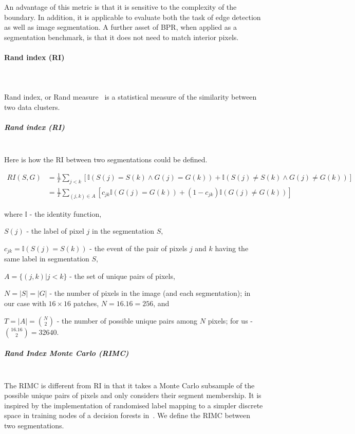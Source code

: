 An advantage of this  metric is that it is sensitive to the complexity of the boundary. In addition, it is applicable to evaluate both the task of edge detection as well as image segmentation. A further asset of BPR, when applied as a segmentation benchmark, is that it does not need to match interior pixels.

\paragraph{Rand index (RI)}\mbox{}\\\mbox{}\\
Rand index, or Rand measure~\cite{rand1971objective} is a statistical measure of the similarity between two data clusters.

\subparagraph{Rand index (RI)}\mbox{}\\
\label{par:ch4-RI-maths}
Here is how the RI between two segmentations could be defined.

\begin{align*}
RI(S,G) & =\frac{1}{T}\sum\limits _{j<k}\left[\mathbb{I}\left(S(j)=S(k)\wedge G(j)=G(k)\right)+\mathbb{I}\left(S(j)\neq S(k)\wedge G(j)\neq G(k)\right)\right]\\
 & =\frac{1}{T}\sum\limits _{(j,k)\in A}\left[c_{jk}\mathbb{I}\left(G(j)=G(k)\right)+(1-c_{jk})\mathbb{I}\left(G(j)\neq G(k)\right)\right]
\end{align*}

where $\mathbb{I}$ - the identity function,

$S(j)$ - the label of pixel $j$ in the segmentation $S$,

$c_{jk}=\mathbb{I}\left(S(j)=S(k)\right)$ - the event of the pair
of pixels $j$ and $k$ having the same label in segmentation $S$,

$A=\{(j,k)|j<k\}$ - the set of unique pairs of pixels,

$N=\left|S\right|=\left|G\right|$ - the number of pixels in the image
(and each segmentation); in our case with $16\times 16$ patches, $N=16 . 16 = 256$, and 

$T=|A|=\binom{N}{2}$ - the number of possible unique pairs among
$N$ pixels; for us - $\binom{16 . 16}{2}=32 640$.


\subparagraph{Rand Index Monte Carlo (RIMC)}\mbox{}\\ %
\label{par:ch4-RIMC-maths}
The RIMC is different from RI in that it takes a Monte Carlo subsample of the possible unique pairs of pixels and only considers their segment membership. It is inspired by the implementation of randomised label mapping to a simpler discrete space in training nodes of a decision forests in~\cite{DollarICCV13edges}. We define the RIMC between two segmentations.

